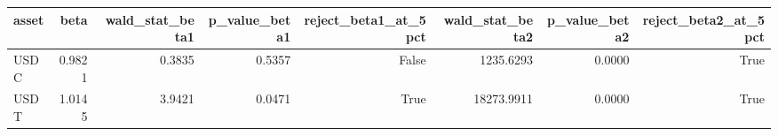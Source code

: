 \begin{tabular}{lrrrrrrr}
\toprule
asset & beta & wald_stat_beta1 & p_value_beta1 & reject_beta1_at_5pct & wald_stat_beta2 & p_value_beta2 & reject_beta2_at_5pct \\
\midrule
USDC & 0.9821 & 0.3835 & 0.5357 & False & 1235.6293 & 0.0000 & True \\
USDT & 1.0145 & 3.9421 & 0.0471 & True & 18273.9911 & 0.0000 & True \\
\bottomrule
\end{tabular}
